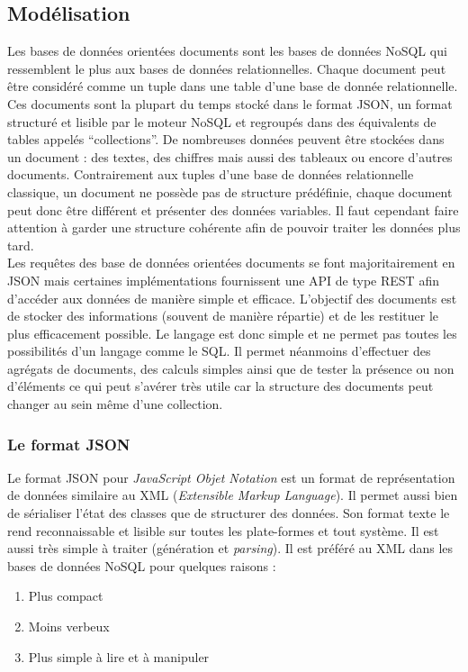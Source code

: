 \subsection{Modélisation}

	Les bases de données orientées documents sont les bases de données NoSQL qui ressemblent le plus aux bases de données relationnelles. Chaque document peut être considéré comme un tuple dans une table d'une base de donnée relationnelle. Ces documents sont la plupart du temps stocké dans le format JSON, un format structuré et lisible par le moteur NoSQL et regroupés dans des équivalents de tables appelés \enquote{collections}. De nombreuses données peuvent être stockées dans un document : des textes, des chiffres mais aussi des tableaux ou encore d'autres documents. Contrairement aux tuples d'une base de données relationnelle classique, un document ne possède pas de structure prédéfinie, chaque document peut donc être différent et présenter des données variables. Il faut cependant faire attention à garder une structure cohérente afin de pouvoir traiter les données plus tard.\\

	Les requêtes des base de données orientées documents se font majoritairement en JSON mais certaines implémentations fournissent une API de type REST afin d’accéder aux données de manière simple et efficace. L'objectif des documents est de stocker des informations (souvent de manière répartie) et de les restituer le plus efficacement possible. Le langage est donc simple et ne permet pas toutes les possibilités d'un langage comme le SQL. Il permet néanmoins d'effectuer des agrégats de documents, des calculs simples ainsi que de tester la présence ou non d'éléments ce qui peut s'avérer très utile car la structure des documents peut changer au sein même d'une collection.

\subsubsection{Le format JSON}

	Le format JSON pour \textit{JavaScript Objet Notation} est un format de représentation de données similaire au XML (\textit{Extensible Markup Language}). Il permet aussi bien de sérialiser l'état des classes que de structurer des données. Son format texte le rend reconnaissable et lisible sur toutes les plate-formes et tout système. Il est aussi très simple à traiter (génération et \textit{parsing}). Il est préféré au XML dans les bases de données NoSQL pour quelques raisons :
	\vspace{10px}
	\begin{enumerate}
		\item Plus compact
		\item Moins verbeux
		\item Plus simple à lire et à manipuler
	\end{enumerate}

